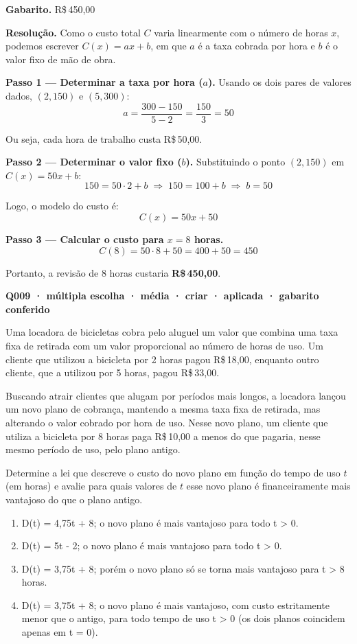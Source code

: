 \documentclass[11pt,a4paper]{article}
\begin{document}
\textbf{Gabarito.} R\$\,450,00

\textbf{Resolução.} Como o custo total $C$ varia linearmente com o número de horas $x$, podemos escrever $C(x) = ax + b$, em que $a$ é a taxa cobrada por hora e $b$ é o valor fixo de mão de obra.

\textbf{Passo 1 — Determinar a taxa por hora ($a$).}
Usando os dois pares de valores dados, $(2, 150)$ e $(5, 300)$:
$$a = \frac{300 - 150}{5 - 2} = \frac{150}{3} = 50$$

Ou seja, cada hora de trabalho custa R\$\,50,00.

\textbf{Passo 2 — Determinar o valor fixo ($b$).}
Substituindo o ponto $(2, 150)$ em $C(x) = 50x + b$:
$$150 = 50 \cdot 2 + b \;\Rightarrow\; 150 = 100 + b \;\Rightarrow\; b = 50$$

Logo, o modelo do custo é:
$$C(x) = 50x + 50$$

\textbf{Passo 3 — Calcular o custo para $x = 8$ horas.}
$$C(8) = 50 \cdot 8 + 50 = 400 + 50 = 450$$

Portanto, a revisão de 8 horas custaria \textbf{R\$\,450,00}.

\bigskip\noindent\textbf{Q009 · múltipla escolha · média · criar · aplicada · gabarito conferido}\par\nopagebreak
Uma locadora de bicicletas cobra pelo aluguel um valor que combina uma taxa fixa de retirada com um valor proporcional ao número de horas de uso. Um cliente que utilizou a bicicleta por 2 horas pagou R\$\,18,00, enquanto outro cliente, que a utilizou por 5 horas, pagou R\$\,33,00.

Buscando atrair clientes que alugam por períodos mais longos, a locadora lançou um novo plano de cobrança, mantendo a mesma taxa fixa de retirada, mas alterando o valor cobrado por hora de uso. Nesse novo plano, um cliente que utiliza a bicicleta por 8 horas paga R\$\,10,00 a menos do que pagaria, nesse mesmo período de uso, pelo plano antigo.

Determine a lei que descreve o custo do novo plano em função do tempo de uso $t$ (em horas) e avalie para quais valores de $t$ esse novo plano é financeiramente mais vantajoso do que o plano antigo.
\begin{enumerate}[label=(\alph*)]
\item D(t) = 4,75t + 8; o novo plano é mais vantajoso para todo t > 0.
\item D(t) = 5t - 2; o novo plano é mais vantajoso para todo t > 0.
\item D(t) = 3,75t + 8; porém o novo plano só se torna mais vantajoso para t > 8 horas.
\item D(t) = 3,75t + 8; o novo plano é mais vantajoso, com custo estritamente menor que o antigo, para todo tempo de uso t > 0 (os dois planos coincidem apenas em t = 0).
\end{enumerate}
\end{document}
